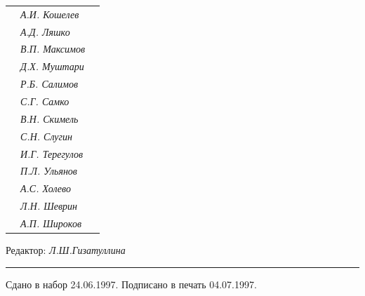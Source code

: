 \begin{tabular}{p{63mm}p{40mm}p{50mm}}
                               &   \it А.И. Кошелев  & \\


                               &   \it А.Д. Ляшко  & \\


                               &   \it В.П. Максимов  & \\


                               &   \it Д.Х. Муштари & \\


                               &   \it Р.Б. Салимов  & \\


                               &   \it С.Г. Самко  & \\


                               &   \it В.Н. Скимель &  \\


                               &   \it С.Н. Слугин  & \\


                               &   \it И.Г. Терегулов  & \\


                               &   \it П.Л. Ульянов  & \\


                               &   \it А.С. Холево  & \\


                               &   \it Л.Н. Шеврин  & \\


                               &   \it А.П. Широков & \\


\end{tabular} 


\bigskip 


\bigskip 


\bigskip 





 


\centerline{Редактор: \it Л.Ш.Гизатуллина}


\bigskip 


\hrule 


\setlength{\hoffset}{-23mm}


\bigskip


\noindent Сдано в набор 24.06.1997. Подписано в печать 04.07.1997.


